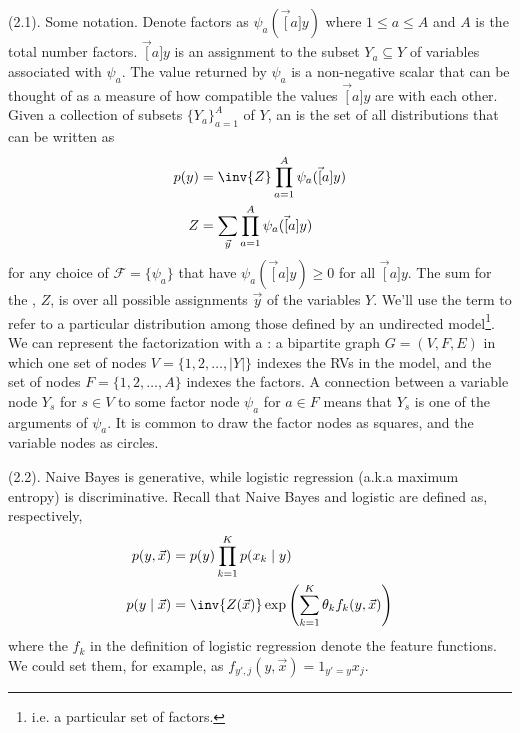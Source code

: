\documentclass[11pt]{article}
\begin{document}
\p {} (2.1). Some notation. Denote factors as $\psi_a(\vec[a]{y})$ where $1 \le a \le A$ and $A$ is the total number factors. $\vec[a]{y}$ is an assignment to the subset $Y_a \subseteq Y$ of variables associated with $\psi_a$. The value returned by $\psi_a$ is a non-negative scalar that can be thought of as a measure of how compatible the values $\vec[a]{y}$ are with each other. Given a collection of subsets $\{Y_a\}_{a=1}^{A}$ of $Y$, an  is the set of all distributions that can be written as
\begin{align}
p(y) &= \inv{Z} \prod_{a=1}^A \psi_a(\vec[a]{y}) \\
Z &= \sum_{\vec{y}} \prod_{a=1}^A \psi_a(\vec[a]{y})
\end{align}
for any choice of  $\mathcal{F} = \{\psi_a\}$ that have $\psi_a(\vec[a]{y}) \ge 0$ for all $\vec[a]{y}$. The sum for the , $Z$, is over all possible assignments $\vec{y}$ of the variables $Y$. We'll use the term  to refer to a particular distribution among those defined by an undirected model\footnote{i.e. a particular set of factors.}. \\

\p We can represent the factorization with a : a bipartite graph $G = (V, F, E)$ in which one set of nodes $V = \{1, 2, \ldots, |Y| \}$ indexes the RVs in the model, and the set of nodes $F= \{1, 2, \ldots, A\}$ indexes the factors. A connection between a variable node $Y_s$ for $s \in V$ to some factor node $\psi_a$ for $a \in F$ means that $Y_s$ is one of the arguments of $\psi_a$. It is common to draw the factor nodes as squares, and the variable nodes as circles.


\myspace
\p {} (2.2). Naive Bayes is generative, while logistic regression (a.k.a maximum entropy) is discriminative. Recall that Naive Bayes and logistic are defined as, respectively,
\begin{align}
p(y, \vec{x}) &= p(y) \prod_{k = 1}^{K} p(x_k \mid y) \\
p(y \mid \vec{x}) &= \inv{Z(\vec{x})} \exp \left( \sum_{k = 1}^K \theta_{k} f_k(y, \vec{x})  \right)
\end{align}
where the $f_k$ in the definition of logistic regression denote the feature functions. We could set them, for example, as $f_{y', j} (y, \vec{x}) = 1_{y' = y} x_j$. \\
\end{document}
